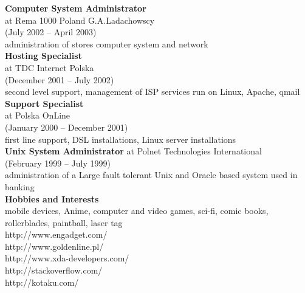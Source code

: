 \documentclass[9pt,a4paper,twocolumn]{extarticle}
\begin{document}
{\bf Computer System Administrator }\\
at Rema 1000 Poland G.A.Ladachowscy \\
(July 2002 – April 2003) \\
administration of stores computer system and network \\

{\bf Hosting Specialist }\\
at TDC Internet Polska \\
(December 2001 – July 2002) \\
second level support, management of ISP services run on Linux, Apache, qmail \\

{\bf Support Specialist }\\
at Polska OnLine \\
(January 2000 – December 2001) \\
ﬁrst line support, DSL installations, Linux server installations\\

{\bf Unix System Administrator }
at Polnet Technologies International \\
(February 1999 – July 1999) \\
administration of a Large fault tolerant Unix and Oracle based system used in banking \\

{\bf\Large Hobbies and Interests}\\

mobile devices, Anime, computer and video games, sci-fi, comic books, rollerblades, paintball, laser tag\\

http://www.engadget.com/\\
http://www.goldenline.pl/\\
http://www.xda-developers.com/\\
http://stackoverflow.com/\\
http://kotaku.com/\\
\end{document}
